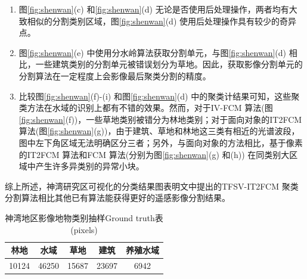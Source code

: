 \begin{enumerate}[(1)]
    \item 图\ref{fig:shenwan}(c) 和\ref{fig:shenwan}(d) 无论是否使用后处理操作，两者均有大致相似的分割类别区域，图\ref{fig:shenwan}(d) 使用后处理操作具有较少的奇异点。
    \item 图\ref{fig:shenwan}(e) 中使用分水岭算法获取分割单元，与图\ref{fig:shenwan}(d) 相比，一些建筑类别的分割单元被错误划分为草地。因此，获取影像分割单元的分割算法在一定程度上会影像最后聚类分割的精度。
    \item 比较图\ref{fig:shenwan}(f)-(i) 和图\ref{fig:shenwan}(d) 中的聚类计结果可知，这些聚类方法在水域的识别上都有不错的效果。然而，对于IV-FCM 算法(图\ref{fig:shenwan}(f))，一些草地类别被错分为林地类别；对于面向对象的IT2FCM 算法(图\ref{fig:shenwan}(g))，由于建筑、草地和林地这三类有相近的光谱波段，图中左下角区域无法明确区分三者；另外，与面向对象的方法相比，基于像素的IT2FCM 算法和FCM 算法(分别为图\ref{fig:shenwan}(g) 和(h)) 在同类别大区域中产生许多异类别的异常小块。
\end{enumerate}
综上所述，神湾研究区可视化的分类结果图表明文中提出的TFSV-IT2FCM 聚类分割算法相比其他已有算法能获得更好的遥感影像分割结果。

\begin{table}[htb]
    \caption{神湾地区影像地物类别抽样Ground truth表(pixels)}\label{tab:shenwan_data}
    \centering
    \begin{tabular}{ccccc}
        \toprule
        林地  & 水域  & 草地  & 建筑  & 养殖水域 \\
        \midrule
        10124 & 46250 & 15687 & 23697 & 6942     \\
        \bottomrule
    \end{tabular}
\end{table}

